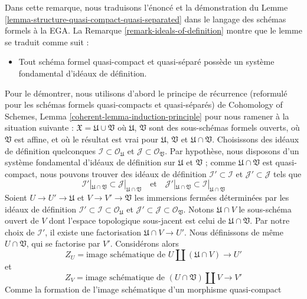 \begin{remark}
\label{remark-structure-quasi-compact-quasi-separated}
Dans cette remarque, nous traduisons l'énoncé et la démonstration du
Lemme \ref{lemma-structure-quasi-compact-quasi-separated}
dans le langage des schémas formels \`a la EGA.
La Remarque \ref{remark-ideals-of-definition} montre
que le lemme se traduit comme suit :
\begin{itemize}
\item[(*)] Tout schéma formel quasi-compact et quasi-séparé
possède un système fondamental d'idéaux de définition.
\end{itemize}
Pour le démontrer, nous utilisons d'abord le principe de récurrence (reformulé pour les
schémas formels quasi-compacts et quasi-séparés) de
Cohomology of Schemes, Lemma \ref{coherent-lemma-induction-principle}
pour nous ramener à la situation suivante :
$\mathfrak X = \mathfrak U \cup \mathfrak V$
où $\mathfrak U$, $\mathfrak V$ sont des sous-schémas formels ouverts,
où $\mathfrak V$ est affine, et où le résultat est vrai pour $\mathfrak U$,
$\mathfrak V$ et $\mathfrak U \cap \mathfrak V$. Choisissons des idéaux
de définition quelconques $\mathcal{I} \subset \mathcal{O}_\mathfrak U$
et $\mathcal{J} \subset \mathcal{O}_\mathfrak V$.
Par hypothèse, nous disposons d'un système fondamental d'idéaux
de définition sur $\mathfrak U$ et $\mathfrak V$ ; comme
$\mathfrak U \cap \mathfrak V$ est quasi-compact, nous pouvons trouver
des idéaux de définition $\mathcal{I}' \subset \mathcal{I}$
et $\mathcal{J}' \subset \mathcal{J}$
tels que
$$
\mathcal{I}'|_{\mathfrak U \cap \mathfrak V} \subset
\mathcal{J}|_{\mathfrak U \cap \mathfrak V}
\quad\text{et}\quad
\mathcal{J}'|_{\mathfrak U \cap \mathfrak V} \subset
\mathcal{I}|_{\mathfrak U \cap \mathfrak V}
$$
Soient $U \to U' \to \mathfrak U$ et $V \to V' \to \mathfrak V$ les
immersions fermées déterminées par les idéaux de définition
$\mathcal{I}' \subset \mathcal{I} \subset \mathcal{O}_\mathfrak U$
et
$\mathcal{J}' \subset \mathcal{J} \subset \mathcal{O}_\mathfrak V$.
Notons $\mathfrak U \cap V$ le sous-schéma ouvert de $V$ dont
l'espace topologique sous-jacent est celui de $\mathfrak U \cap \mathfrak V$.
Par notre choix de $\mathcal{I}'$, il existe une factorisation
$\mathfrak U \cap V \to U'$.
Nous définissons de même $U \cap \mathfrak V$, qui se factorise par $V'$.
Considérons alors
$$
Z_U = \text{image schématique de }
U \amalg (\mathfrak U \cap V) \longrightarrow U'
$$
et
$$
Z_V = \text{image schématique de }
(U \cap \mathfrak V) \amalg V \longrightarrow V'
$$
Comme la formation de l'image schématique d'un morphisme quasi-compact

\end{remark}
